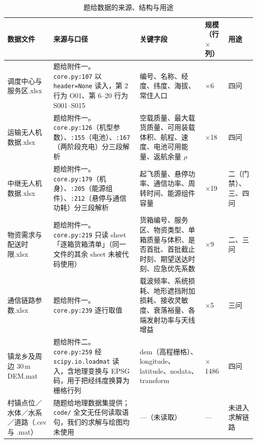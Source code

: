 \begin{table}[htbp]
	\centering
	\small
	\caption{题给数据的来源、结构与用途}
	\label{tab:data-source}
	\begin{tabularx}{\textwidth}{@{}>{\hsize=1.05\hsize}X >{\hsize=1.20\hsize}X >{\hsize=1.30\hsize}X >{\hsize=0.70\hsize}X >{\hsize=0.75\hsize}X@{}}
		\toprule
		数据文件 & 来源与口径 & 关键字段 & 规模（行$\times$列） & 用途 \\
		\midrule
		调度中心与服务区.xlsx & 题给附件一。\texttt{core.py:107} 以 \texttt{header=None} 读入，第 2 行为 O01、第 6--20 行为 S001--S015 & 编号、名称、经度、纬度、海拔、常住人口 & 21$\times$6 & 四问 \\
		\midrule
		运输无人机数据.xlsx & 题给附件一。\texttt{core.py:126}（机型参数）、\texttt{:155}（电池）、\texttt{:167}（两阶段充电）分三段解析 & 空载质量、最大载货质量、可用装载体积、航程、速度、电池可用能量、返航余量 $\rho$ & 22$\times$18 & 四问 \\
		\midrule
		中继无人机数据.xlsx & 题给附件一。\texttt{core.py:179}（机身）、\texttt{:205}（能源组件）、\texttt{:212}（悬停与通信功耗）分三段解析 & 起飞质量、悬停功率、通信功率、周转时间、能源组件容量 & 12$\times$19 & 二（门禁）、三、四问 \\
		\midrule
		物资需求与配送时限.xlsx & 题给附件一。\texttt{core.py:219} 只读 sheet「逐箱货箱清单」（同一文件的其余 sheet 未被代码使用） & 货箱编号、服务区、物资类型、单箱质量与体积、是否首批、首批截止时刻、期望送达时刻、应急优先系数 & 80$\times$9 & 二、三问 \\
		\midrule
		通信链路参数.xlsx & 题给附件一。\texttt{core.py:239} 逐行取值 & 载波频率、系统损耗、地形遮挡附加损耗、接收灵敏度、衰落裕量、各端发射功率与天线增益 & 16$\times$5 & 三问 \\
		\midrule
		镇龙乡及周边 30\,m DEM.mat & 题给附件二。\texttt{core.py:259} 经 \texttt{scipy.io.loadmat} 读入，含地理变换与 EPSG 码，用于把经纬度换算为栅格行列 & dem（高程栅格）、longitude、latitude、nodata、transform & 1309$\times$1486 & 四问 \\
		\midrule
		村镇点位／水体／水系／道路（.csv 与 .mat） & 随题给地理数据集提供；\texttt{code/} 全文无任何读取语句，我们的求解与绘图均未使用 & ---（未读取） & --- & 未进入求解链路 \\
		\bottomrule
	\end{tabularx}
\end{table}
